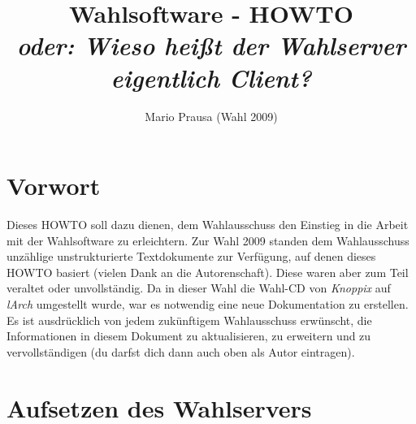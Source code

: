 \documentclass[a4paper,10pt]{article}
\title{Wahlsoftware - HOWTO \\ \small{\textit{oder: Wieso heißt der Wahlserver eigentlich Client?}}}
\author{Mario Prausa (Wahl 2009)}
\begin{document}
\maketitle
\tableofcontents

\section*{Vorwort}
Dieses HOWTO soll dazu dienen, dem Wahlausschuss den Einstieg in die Arbeit mit der Wahlsoftware zu erleichtern. Zur Wahl 2009 standen dem Wahlausschuss unzählige unstrukturierte Textdokumente zur Verfügung, auf denen dieses HOWTO basiert (vielen Dank an die Autorenschaft). Diese waren aber zum Teil veraltet oder unvollständig. Da in dieser Wahl die Wahl-CD von \textit{Knoppix} auf \textit{lArch} umgestellt wurde, war es notwendig eine neue Dokumentation zu erstellen. Es ist ausdrücklich von jedem zukünftigem Wahlausschuss erwünscht, die Informationen in diesem Dokument zu aktualisieren, zu erweitern und zu vervollständigen (du darfst dich dann auch oben als Autor eintragen).
\newpage

\section{Aufsetzen des Wahlservers}
\end{document}
